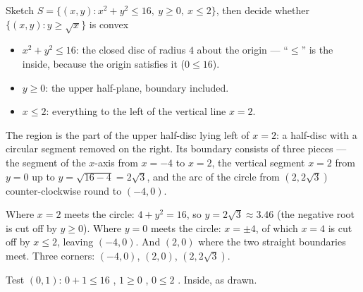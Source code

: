 \begin{worked}{Sketch $S=\{(x,y):x^{2}+y^{2}\le16,\ y\ge0,\ x\le2\}$, then decide whether $\{(x,y):y\ge\sqrt{x}\}$ is convex}
\begin{itemize}[leftmargin=1.6em,itemsep=0.2ex]
  \item $x^{2}+y^{2}\le16$: the closed disc of radius $4$ about the origin
        --- ``$\le$'' is the inside, because the origin satisfies it
        ($0\le16$).
  \item $y\ge0$: the upper half-plane, boundary included.
  \item $x\le2$: everything to the left of the vertical line $x=2$.
\end{itemize}

The region is the part of the upper half-disc lying left of $x=2$: a
half-disc with a circular segment removed on the right. Its boundary
consists of three pieces --- the segment of the $x$-axis from $x=-4$ to
$x=2$, the vertical segment $x=2$ from $y=0$ up to $y=\sqrt{16-4}=2\sqrt3$,
and the arc of the circle from $(2,2\sqrt3)$ counter-clockwise round to
$(-4,0)$.

Where $x=2$ meets the circle: $4+y^{2}=16$, so $y=2\sqrt3\approx3.46$ (the
negative root is cut off by $y\ge0$). Where $y=0$ meets the circle:
$x=\pm4$, of which $x=4$ is cut off by $x\le2$, leaving $(-4,0)$. And
$(2,0)$ where the two straight boundaries meet. Three corners:
$(-4,0)$, $(2,0)$, $(2,2\sqrt3)$.

\begin{center}
\end{center}
Test $(0,1)$: $0+1\le16$ \checkmark, $1\ge0$ \checkmark, $0\le2$
\checkmark. Inside, as drawn.


\end{worked}

